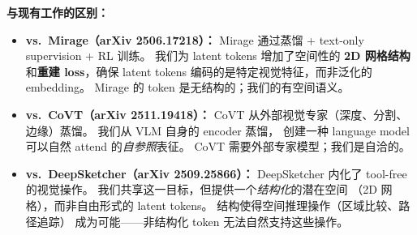 \documentclass[12pt,a4paper]{article}
\begin{document}
\begin{relatedbox}
\textbf{与现有工作的区别：}
\begin{itemize}[leftmargin=1.5em]
  \item \textbf{vs.\ Mirage（arXiv 2506.17218）：}
    Mirage 通过蒸馏 + text-only supervision + RL 训练。
    我们为 latent tokens 增加了空间性的 \textbf{2D 网格结构}
    和\textbf{重建 loss}，确保 latent tokens
    编码的是特定视觉特征，而非泛化的 embedding。
    Mirage 的 token 是无结构的；我们的有空间语义。
  \item \textbf{vs.\ CoVT（arXiv 2511.19418）：}
    CoVT 从外部视觉专家（深度、分割、边缘）蒸馏。
    我们从 VLM 自身的 encoder 蒸馏，
    创建一种 language model 可以自然 attend 的\textit{自参照}表征。
    CoVT 需要外部专家模型；我们是自洽的。
  \item \textbf{vs.\ DeepSketcher（arXiv 2509.25866）：}
    DeepSketcher 内化了 tool-free 的视觉操作。
    我们共享这一目标，但提供一个\textit{结构化}的潜在空间
    （2D 网格），而非自由形式的 latent tokens。
    结构使得空间推理操作（区域比较、路径追踪）
    成为可能——非结构化 token 无法自然支持这些操作。
\end{itemize}
\end{relatedbox}
\end{document}
